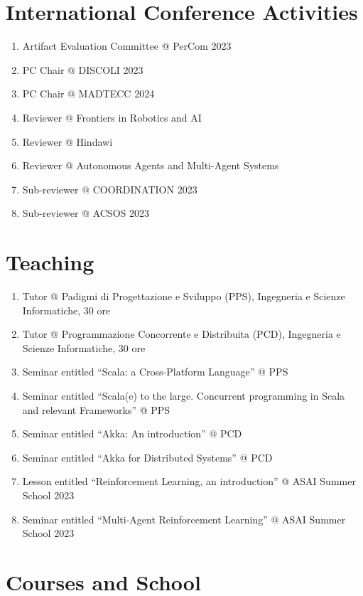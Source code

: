 \documentclass[11pt]{article}
\begin{document}
\section{International Conference Activities}
\begin{enumerate}
	\item Artifact Evaluation Committee @ PerCom 2023
	\item PC Chair @ DISCOLI 2023
	\item PC Chair @ MADTECC 2024
	\item Reviewer @ Frontiers in Robotics and AI
	\item Reviewer @ Hindawi
	\item Reviewer @ Autonomous Agents and Multi-Agent Systems 
	\item Sub-reviewer @ COORDINATION 2023
	\item Sub-reviewer @ ACSOS 2023
\end{enumerate}
\section{Teaching}
\begin{enumerate}
	\item Tutor @ Padigmi di Progettazione e Sviluppo (PPS), Ingegneria e Scienze Informatiche, 30 ore
	\item Tutor @ Programmazione Concorrente e Distribuita (PCD), Ingegneria e Scienze Informatiche, 30 ore
	\item Seminar entitled ``Scala: a Cross-Platform Language'' @ PPS
	\item Seminar entitled ``Scala(e) to the large. Concurrent programming in Scala and relevant Frameworks'' @ PPS
	\item Seminar entitled ``Akka: An introduction'' @ PCD
	\item Seminar entitled ``Akka for Distributed Systems'' @ PCD
	\item Lesson entitled ``Reinforcement Learning, an introduction'' @ ASAI Summer School 2023
	\item Seminar entitled ``Multi-Agent Reinforcement Learning'' @ ASAI Summer School 2023
\end{enumerate}
\section{Courses and School}
\end{document}
